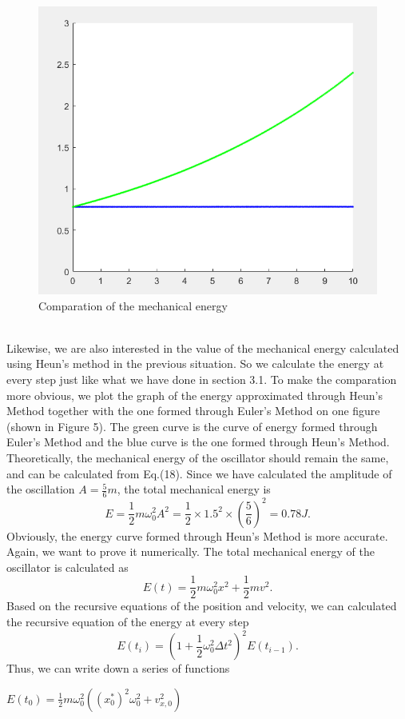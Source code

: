 \documentclass[12pt]{report}
\begin{document}
\begin{figure}[htbp]
\centering
\includegraphics[width=0.6\linewidth]{3-2-3.png}
\caption{Comparation of the mechanical energy}
\end{figure}\\
Likewise, we are also interested in the value of the mechanical energy calculated using Heun's method in the previous situation. So we calculate the energy at every step just like what we have done in section 3.1. To make the comparation more obvious, we plot the graph of the energy approximated through Heun's Method together with the one formed through Euler's Method on one figure (shown in Figure 5). The green curve is the curve of energy formed through Euler's Method and the blue curve is the one formed through Heun's Method. Theoretically, the mechanical energy of the  oscillator should remain the same, and can be calculated from Eq.(18). Since we have calculated the amplitude of the oscillation $A=\frac{5}{6}m$, the total mechanical energy is 
\begin{equation}
	E=\frac{1}{2}m\omega_0^2 A^2=\frac{1}{2}\times 1.5^2\times(\frac{5}{6})^2=0.78J.
\end{equation}
Obviously, the energy curve formed through Heun's Method is more accurate. Again, we want to prove it numerically. The total mechanical energy of the oscillator is calculated as
\begin{equation}
    E(t)=\frac{1}{2}m\omega_{0}^2x^2+\frac{1}{2}mv^2.
\end{equation}
Based on the recursive equations of the position and velocity, we can calculated the recursive equation of the energy at every step
\begin{equation}
    E(t_{i})=(1+\frac{1}{2}\omega_{0}^2\Delta t^2)^2E(t_{i-1}).
\end{equation}
Thus, we can write down a series of functions
\newline\centerline{$E(t_{0})=\frac{1}{2}m\omega_{0}^2((x_{0}^*)^2\omega_{0}^2+v_{x,0}^2)$}
\end{document}
